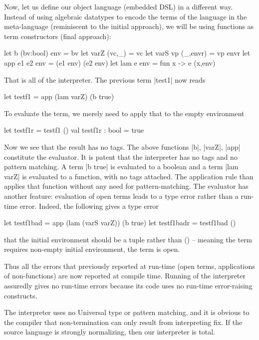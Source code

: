 \documentclass[preprint]{sigplanconf}
\begin{document}
Now, let us define our object language (embedded DSL) in a different
way. Instead of using algebraic datatypes to encode the terms of the
language in the meta-language (reminiscent to the initial approach),
we will be using functions as term constructors (final approach):

\begin{code}
  let b (bv:bool) env = bv
  let varZ (vc,_) = vc
  let varS vp (_,envr) = vp envr
  let app e1 e2 env = (e1 env) (e2 env)
  let lam e env = fun x -> e (x,env)
\end{code}

That is all of the interpreter. The previous term |test1| now reads
\begin{code}
  let testf1 = app (lam varZ) (b true)
\end{code}

To evaluate the term, we merely need to apply that to the empty
environment

\begin{code}
  let testf1r = testf1 ()
  val testf1r : bool = true
\end{code}

Now we see that the result has no tags. The above functions |b|,
|varZ|, |app| constitute the evaluator. It is patent that the
interpreter has no tags and no pattern matching. A term |b true| is
evaluated to a boolean and a term |lam varZ| is evaluated to a
function, with no tags attached. The application rule than applies that
function without any need for pattern-matching. The evaluator has
another feature: evaluation of open terms leads to a type error rather
than a run-time error. Indeed, the following gives a type error

\begin{code}
  let testf1bad = app (lam (varS varZ)) (b true)
  let testf1badr = testf1bad ()
\end{code}
that the initial environment should be a tuple rather than () --
meaning the term requires non-empty initial environment, the term is
open.

Thus all the errors that previously reported at run-time (open terms,
applications of non-functions) are now reported at compile
time. Running of the interpreter assuredly gives no run-time errors
because its code uses no run-time error-raising constructs.



The interpreter uses no Universal type or pattern matching, and it
is obvious to the compiler that non-termination can only result from
interpreting fix.  If the source language is strongly normalizing, then
our interpreter is total.
\end{document}
